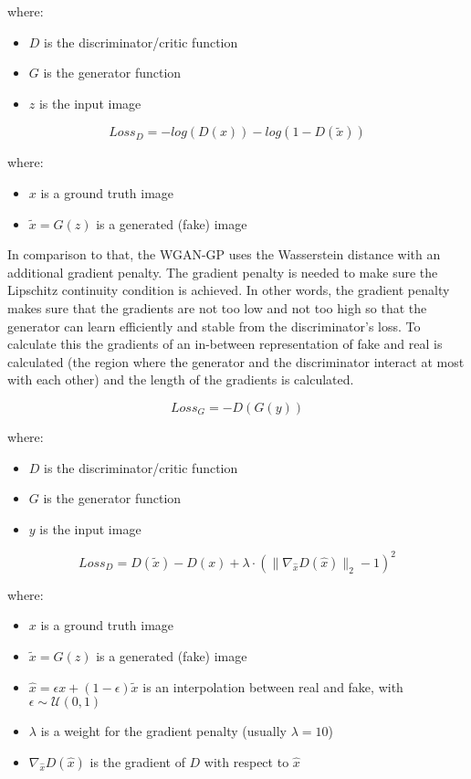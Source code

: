 		\noindent where:
		\begin{itemize}
			\item $D$ is the discriminator/critic function
			\item $G$ is the generator function
			\item $z$ is the input image
		\end{itemize}
		
		\begin{equation}
			Loss_D = -log(D(x)) - log(1 - D(\tilde{x}))
		\end{equation}
		
		\noindent where:
		\begin{itemize}
			\item $x$ is a ground truth image
			\item $\tilde{x} = G(z)$ is a generated (fake) image
		\end{itemize}
		
		In comparison to that, the WGAN-GP uses the Wasserstein distance with an additional gradient penalty. The gradient penalty is needed to make sure the Lipschitz continuity condition is achieved. In other words, the gradient penalty makes sure that the gradients are not too low and not too high so that the generator can learn efficiently and stable from the discriminator's loss. To calculate this the gradients of an in-between representation of fake and real is calculated (the region where the generator and the discriminator interact at most with each other) and the length of the gradients is calculated. 
		
		\begin{equation}
			Loss_G = -D( G(y) )
		\end{equation}
		
		\noindent where:
		\begin{itemize}
			\item $D$ is the discriminator/critic function
			\item $G$ is the generator function
			\item $y$ is the input image
		\end{itemize}
		
		\begin{equation}
			Loss_D = D(\tilde{x}) - D(x) + \lambda \cdot \left( \| \nabla_{\hat{x}} D(\hat{x}) \|_2 - 1 \right)^2
		\end{equation}
		
		\noindent where:
		\begin{itemize}
			\item $x$ is a ground truth image
			\item $\tilde{x} = G(z)$ is a generated (fake) image
			\item $\hat{x} = \epsilon x + (1 - \epsilon) \tilde{x}$ is an interpolation between real and fake, with $\epsilon \sim \mathcal{U}(0,1)$
			\item $\lambda$ is a weight for the gradient penalty (usually $\lambda = 10$)
			\item $\nabla_{\hat{x}} D(\hat{x})$ is the gradient of $D$ with respect to $\hat{x}$
		\end{itemize}
		
